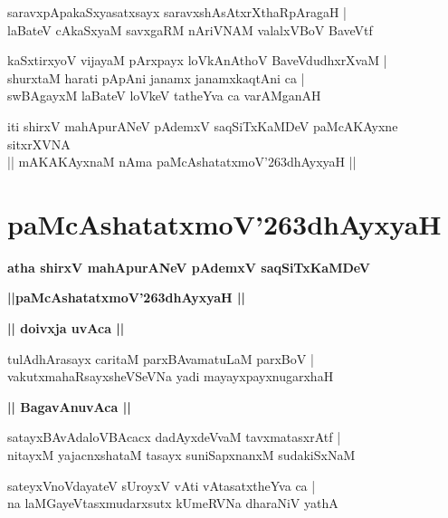 \documentclass[twoside,12pt,openright]{book}
\def\S{\char'263}
\newcounter{shloka}[chapter]
\def\uvaca#1{\centerline{{\large\textbf{#1}}}}
\begin{document}
\begin{shloka}%
saravxpApakaSxyasatxsayx saravxshAsAtxrXthaRpAragaH |\\
laBateV cAkaSxyaM savxgaRM nAriVNAM valalxVBoV BaveVtf
\end{shloka}

\begin{shloka}%
kaSxtirxyoV vijayaM pArxpayx loVkAnAthoV BaveVdudhxrXvaM |\\
shurxtaM harati pApAni janamx janamxkaqtAni ca |\\
swBAgayxM laBateV loVkeV tatheYva ca varAMganAH 
\end{shloka}

\begin{center}
iti shirxV mahApurANeV pAdemxV saqSiTxKaMDeV paMcAKAyxne sitxrXVNA\\ 
|| mAKAKAyxnaM nAma paMcAshatatxmoV\S dhAyxyaH ||
\end{center}

\chapter{paMcAshatatxmoV\S dhAyxyaH}

\begin{center}
{\LARGE\bfseries atha shirxV mahApurANeV pAdemxV saqSiTxKaMDeV}
\end{center}

\begin{center}
{\LARGE\bfseries ||paMcAshatatxmoV\S dhAyxyaH || }
\end{center}

\uvaca{|| doivxja uvAca ||}

\begin{shloka}%
tulAdhArasayx caritaM parxBAvamatuLaM parxBoV |\\
vakutxmahaRsayxsheVSeVNa yadi mayayxpayxnugarxhaH 
\end{shloka}

\uvaca{|| BagavAnuvAca ||}

\begin{shloka}%
satayxBAvAdaloVBAcacx dadAyxdeVvaM tavxmatasxrAtf |\\
nitayxM yajacnxshataM tasayx suniSapxnanxM sudakiSxNaM
\end{shloka}

\begin{shloka}%
sateyxVnoVdayateV sUroyxV vAti vAtasatxtheYva ca |\\
na laMGayeVtasxmudarxsutx kUmeRVNa dharaNiV yathA
\end{shloka}
\end{document}
